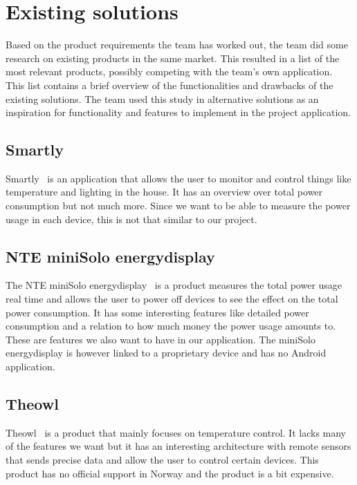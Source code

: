 \section{Existing solutions}
\label{sec:altsolution}
Based on the product requirements the team has worked out, the team did some research on existing products in the 
same market. This resulted in a list of the most relevant products, possibly competing with the team's own application. 
This list contains a brief overview of the functionalities and drawbacks of the existing solutions. 
The team used this study in alternative solutions as an inspiration for functionality and features to implement 
in the project application.

\subsection{Smartly}

Smartly~\cite{smartly} is an application that allows the user to monitor and control things like 
temperature and lighting in the house. It has an overview over total power consumption but not much more. 
Since we want to be able to measure the power usage in each device, this is not that similar to our project. 


\subsection{NTE miniSolo energydisplay}

The NTE miniSolo energydisplay~\cite{nte} is a product measures the total power usage real time and allows 
the user to power off devices to see the effect on the total power consumption. 
It has some interesting features like detailed power consumption and a relation to how much money the power 
usage amounts to. These are features we also want to have in our application. The miniSolo energydisplay is 
however linked to a proprietary device and has no Android application.



\subsection{Theowl}

Theowl~\cite{theowl} is a product that mainly focuses on temperature control. 
It lacks many of the features we want but it has an interesting architecture with remote sensors that 
sends precise data and allow the user to control certain devices. This product has no official support in
Norway and the product is a bit expensive.


